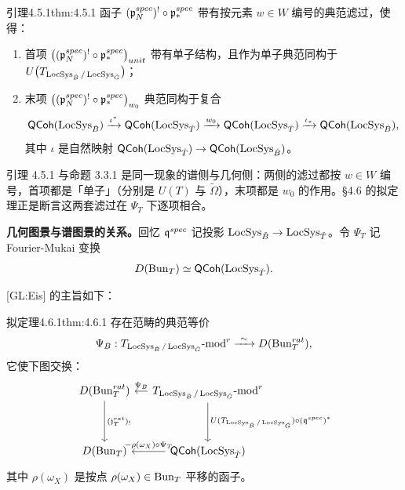 \begin{othm}{引理}{4.5.1}{thm:4.5.1}
函子 $(\mathfrak{p}^{spec}_N)^!\circ\mathfrak{p}^{spec}_*$ 带有按元素 $w\in W$ 编号的典范滤过，使得：
\begin{enumerate}[label=(\alph*), leftmargin=2.4em, itemsep=0.25em]
\item 首项 $\bigl((\mathfrak{p}^{spec}_N)^!\circ\mathfrak{p}^{spec}_*\bigr)_{unit}$ 带有单子结构，且作为单子典范同构于 $U\bigl(T_{\operatorname{LocSys}_{\check B}/\operatorname{LocSys}_{\check G}}\bigr)$；
\item 末项 $\bigl((\mathfrak{p}^{spec}_N)^!\circ\mathfrak{p}^{spec}_*\bigr)_{w_0}$ 典范同构于复合
\[
  \mathsf{QCoh}(\operatorname{LocSys}_{\check B})\xrightarrow{\iota^*}\mathsf{QCoh}(\operatorname{LocSys}_{\check T})
  \xrightarrow{w_0}\mathsf{QCoh}(\operatorname{LocSys}_{\check T})
  \xrightarrow{\iota_*}\mathsf{QCoh}(\operatorname{LocSys}_{\check B}),
\]
其中 $\iota$ 是自然映射 $\mathsf{QCoh}(\operatorname{LocSys}_{\check T})\to\mathsf{QCoh}(\operatorname{LocSys}_{\check B})$。
\end{enumerate}
\end{othm}

\begin{annote}
引理 4.5.1 与命题 3.3.1 是同一现象的谱侧与几何侧：两侧的滤过都按 $w\in W$ 编号，首项都是「单子」（分别是 $U(T)$ 与 $\widetilde\Omega$），末项都是 $w_0$ 的作用。§4.6 的拟定理正是断言这两套滤过在 $\Psi_T$ 下逐项相合。\par\vspace{0.15em}{\raggedleft 【来源：原书 p.5 命题 3.3.1 与 p.7 引理 4.5.1 的对照（A）】\par}
\end{annote}

\textbf{几何图景与谱图景的关系。}回忆 $\mathfrak{q}^{spec}$ 记投影 $\operatorname{LocSys}_{\check B}\to\operatorname{LocSys}_{\check T}$。令 $\Psi_T$ 记 Fourier-Mukai 变换
\[
  D(\operatorname{Bun}_T)\simeq\mathsf{QCoh}(\operatorname{LocSys}_{\check T}).
\]

[GL:Eis] 的主旨如下：

\begin{othm}{拟定理}{4.6.1}{thm:4.6.1}
存在范畴的典范等价
\[
  \Psi_B : T_{\operatorname{LocSys}_{\check B}/\operatorname{LocSys}_{\check G}}\text{-}\mathrm{mod}^r
  \xrightarrow{\ \sim\ } D(\operatorname{Bun}^{rat}_T),
\]
它使下图交换：
\[
\begin{tikzcd}[row sep=3.6em, column sep=3.2em, ampersand replacement=\&]
  D(\Bun\rt_T) \&[-2em] T_{\LocSys_{\Ch B}/\LocSys_{\Ch G}}\text{-}\mathrm{mod}^r
    \arrow[l, "\Psi_B"'] \\
  D(\Bun_T) \& \QCoh(\LocSys_{\Ch T})
    \arrow[l, "-\rho(\omega_X)\circ\Psi_T"']
    \arrow[from=1-1, to=2-1, "(\fJ\rt_T)_!"]
    \arrow[from=1-2, to=2-2, "U(T_{\LocSys_{\Ch B}/\LocSys_{\Ch G}})\circ(\fQ\st)^*"]
\end{tikzcd}
\]
其中 $\rho(\omega_X)$ 是按点 $\rho(\omega_X)\in\operatorname{Bun}_T$ 平移的函子。
\end{othm}

